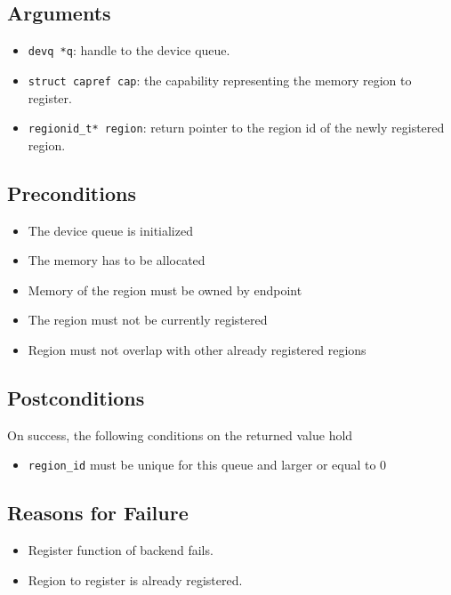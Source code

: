 \documentclass[a4paper,11pt,twoside]{report}
\begin{document}
{{	\subsection*{Arguments}
	\begin{itemize}
		\item \texttt{devq *q}: handle to the device queue.
		\item \texttt{struct capref cap}: the capability representing the memory region to register.
		\item \texttt{regionid\_t* region}: return pointer to the region id of the newly registered region.
	\end{itemize}
	\subsection*{Preconditions}
	\begin{itemize}
		\item The device queue is initialized
		\item The memory has to be allocated
		\item Memory of the region must be owned by endpoint 
		\item The region must not be currently registered
		\item Region must not overlap with other already registered regions 
	\end{itemize}
	\subsection*{Postconditions}
	On success, the following conditions on the returned value hold
	\begin{itemize}
		\item \texttt{region\_id} must be unique for this queue and larger or equal to 0
	\end{itemize}
	
	\subsection*{Reasons for Failure}
	\begin{itemize}
		\item Register function of backend fails.
		\item Region to register is already registered.
	\end{itemize}
	
}}
\end{document}
